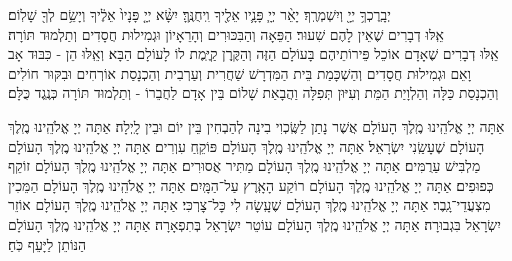 \birkothatorah
יְבָֽרֶכְךָ֥ יְיָ֖ וְיִשְׁמְרֶֽךָ׃ יָאֵ֨ר יְיָ֧ פָּנָ֛יו אֵלֶ֖יךָ וִֽיחֻנֶּֽךָּ׃ יִשָּׂ֨א יְיָ֤ פָּנָיו֙ אֵלֶ֔יךָ וְיָשֵׂ֥ם לְךָ֖ שָׁלֽוֹם׃\\
אֵֽלּוּ דְבָרִים שֶׁאֵין לָהֶם שִׁעוּר׃ הַפֵּאָה וְהַבִּכּוּרִים וְהָרֵאָיוֹן וּגְמִילוּת חֲסָדִים וְתַלְמוּד תּוֹרָה׃\\
אֵֽלּוּ דְבָרִים שֶׁאָדָם אוֹכֵל פֵּירוֹתֵיהֶם בָּעוֹלָם הַזֶּה וְהַקֶּֽרֶן קַיֶּֽמֶת לוֹ לָעוֹלָם הַבָּא׃ וְאֵֽלּוּ הֵן - כִּבּוּד אָב וָאֵם וּגְמִילוּת חֲסָדִים וְהַשְׁכָּמַת בֵּית הַמִּדְרָשׁ שַׁחֲרִית וְעַרְבִית וְהַכְנָסַת אוֹרְחִים וּבִקּוּר חוֹלִים וְהַכְנָסַת כַּלָּה וְהַלְוָיַת הַמֵּת וְעִיּוּן תְּפִלָּה וַהֲבָאַת שָׁלוֹם בֵּין אָדָם לַחֲבֵרוֹ - וְתַלְמוּד תּוֹרָה כְּנֶֽגֶד כֻּלָּם׃

אַתָּה יְיָ אֱלֹהֵֽינוּ מֶֽלֶךְ הָעוֹלָם אֲשֶׁר נָתַן לַשֶּֽׂכְוִי בִינָה לְהַבְחִין בֵּין יוֹם וּבֵין לָֽיְלָה׃\hfill \break
{}
אַתָּה יְיָ אֱלֹהֵֽינוּ מֶֽלֶךְ הָעוֹלָם שֶׁעָשַֽׂנִי יִשְׂרָאֵל׃\hfill\break
%		
%		
%		
{}
אַתָּה יְיָ אֱלֹהֵֽינוּ מֶֽלֶךְ הָעוֹלָם פּוֹקֵֽחַ עִוְרִים׃\hfill \break
{}
אַתָּה יְיָ אֱלֹהֵֽינוּ מֶֽלֶךְ הָעוֹלָם מַלְבִּישׁ עַרֻמִּים׃\hfill \break
{}
אַתָּה יְיָ אֱלֹהֵֽינוּ מֶֽלֶךְ הָעוֹלָם מַתִּיר אֲסוּרִים׃\hfill \break
{}
אַתָּה יְיָ אֱלֹהֵֽינוּ מֶֽלֶךְ הָעוֹלָם זוֹקֵף כְּפוּפִים׃\hfill \break
{}
אַתָּה יְיָ אֱלֹהֵֽינוּ מֶֽלֶךְ הָעוֹלָם רוֹקַע הָאָֽרֶץ עַל־הַמָּֽיִם׃\hfill \break
{}
אַתָּה יְיָ אֱלֹהֵֽינוּ מֶֽלֶךְ הָעוֹלָם הַמֵּכִין מִצְעֲדֵי־גָֽבֶר׃\hfill \break
{}
אַתָּה יְיָ אֱלֹהֵֽינוּ מֶֽלֶךְ הָעוֹלָם שֶׁעָֽשָׂה לִי כׇּל־צׇרְכִּי׃\hfill \break
{}
אַתָּה יְיָ אֱלֹהֵֽינוּ מֶֽלֶךְ הָעוֹלָם אוֹזֵר יִשְׂרָאֵל בִּגְבוּרָה׃\hfill \break
{}
אַתָּה יְיָ אֱלֹהֵֽינוּ מֶֽלֶךְ הָעוֹלָם עוֹטֵר יִשְׂרָאֵל בְּתִפְאָרָה׃\hfill \break
{}
אַתָּה יְיָ אֱלֹהֵֽינוּ מֶֽלֶךְ הָעוֹלָם הַנּוֹתֵן לַיָּעֵף כֹּֽחַ׃\hfill


